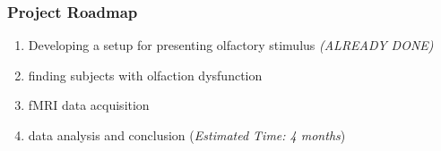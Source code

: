 \documentclass{beamer}
\begin{document}
\begin{frame}
\frametitle{Project Roadmap}
	\begin{enumerate}
		\item
		Developing a setup for presenting olfactory stimulus \textit{(ALREADY DONE)}
		\item
		finding subjects with olfaction dysfunction
		\item
		fMRI data acquisition
		\item
		data analysis and conclusion (\textit{Estimated Time: 4 months})
	\end{enumerate}

\end{frame}

\end{document}
